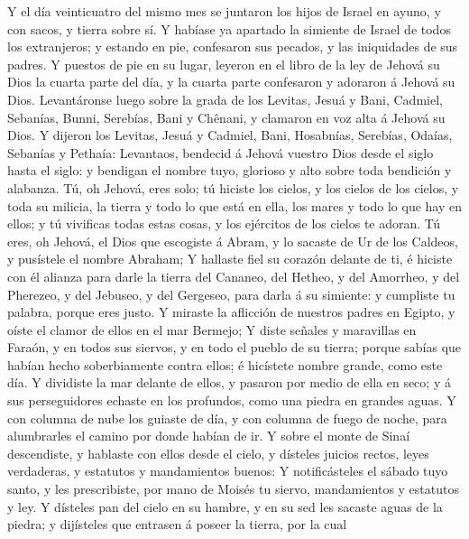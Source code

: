  Y el día veinticuatro del mismo mes se juntaron los hijos
de Israel en ayuno, y con sacos, y tierra sobre sí.  Y
habíase ya apartado la simiente de Israel de todos los extranjeros; y
estando en pie, confesaron sus pecados, y las iniquidades de sus padres.
 Y puestos de pie en su lugar, leyeron en el libro de la
ley de Jehová su Dios la cuarta parte del día, y la cuarta parte
confesaron y adoraron á Jehová su Dios.  Levantáronse
luego sobre la grada de los Levitas, Jesuá y Bani, Cadmiel, Sebanías,
Bunni, Serebías, Bani y Chênani, y clamaron en voz alta á Jehová su
Dios.  Y dijeron los Levitas, Jesuá y Cadmiel, Bani,
Hosabnías, Serebías, Odaías, Sebanías y Pethaía: Levantaos, bendecid á
Jehová vuestro Dios desde el siglo hasta el siglo: y bendigan el nombre
tuyo, glorioso y alto sobre toda bendición y alabanza. 
Tú, oh Jehová, eres solo; tú hiciste los cielos, y los cielos de los
cielos, y toda su milicia, la tierra y todo lo que está en ella, los
mares y todo lo que hay en ellos; y tú vivificas todas estas cosas, y
los ejércitos de los cielos te adoran.  Tú eres, oh
Jehová, el Dios que escogiste á Abram, y lo sacaste de Ur de los
Caldeos, y pusístele el nombre Abraham;  Y hallaste fiel
su corazón delante de ti, é hiciste con él alianza para darle la tierra
del Cananeo, del Hetheo, y del Amorrheo, y del Pherezeo, y del Jebuseo,
y del Gergeseo, para darla á su simiente: y cumpliste tu palabra, porque
eres justo.  Y miraste la aflicción de nuestros padres en
Egipto, y oíste el clamor de ellos en el mar Bermejo;  Y
diste señales y maravillas en Faraón, y en todos sus siervos, y en todo
el pueblo de su tierra; porque sabías que habían hecho soberbiamente
contra ellos; é hicístete nombre grande, como este día. 
Y dividiste la mar delante de ellos, y pasaron por medio de ella en
seco; y á sus perseguidores echaste en los profundos, como una piedra en
grandes aguas.  Y con columna de nube los guiaste de día,
y con columna de fuego de noche, para alumbrarles el camino por donde
habían de ir.  Y sobre el monte de Sinaí descendiste, y
hablaste con ellos desde el cielo, y dísteles juicios rectos, leyes
verdaderas, y estatutos y mandamientos buenos:  Y
notificásteles el sábado tuyo santo, y les prescribiste, por mano de
Moisés tu siervo, mandamientos y estatutos y ley.  Y
dísteles pan del cielo en su hambre, y en su sed les sacaste aguas de la
piedra; y dijísteles que entrasen á poseer la tierra, por la cual
